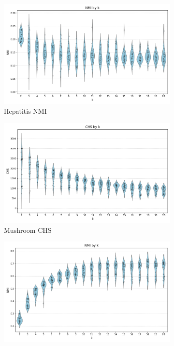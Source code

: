 \begin{figure}[H]
    \centering
    \begin{subfigure}{0.32\textwidth}
        \centering
        \includegraphics[width=\linewidth]{figures/KMeans/hepatitis_violin_k_vs_NMI.png}
        \caption{Hepatitis NMI}
    \end{subfigure}
    \hfill
    \begin{subfigure}{0.32\textwidth}
        \centering
        \includegraphics[width=\linewidth]{figures/KMeans/mushroom_violin_k_vs_CHS.png}
        \caption{Mushroom CHS}
    \end{subfigure}
    \hfill
    \begin{subfigure}{0.32\textwidth}
        \centering
        \includegraphics[width=\linewidth]{figures/KMeans/penbased_violin_k_vs_NMI.png}

\end{subfigure}
\end{figure}
